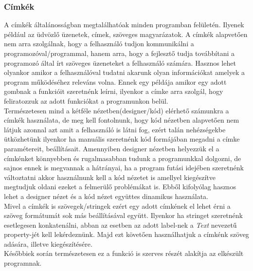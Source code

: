\documentclass[tocnopagenum]{thesis-ekf}
\theoremstyle{definition}
\theoremstyle{remark}
\begin{document}
	\subsubsection{Címkék}
	\label{Címkék}
	A címkék általánosságban megtalálhatóak minden programban felületén. Ilyenek például az üdvözlő üzenetek, címek, szöveges magyarázatok.
	A címkék alapvetően nem arra szolgálnak, hogy a felhasználó tudjon kommunikálni a programozóval/programmal, hanem arra, hogy a fejlesztő tudja továbbítani a programozó által írt szöveges üzeneteket a felhasználó számára. Hasznos lehet olyankor amikor a felhasználóval tudatni akarunk olyan információkat amelyek a  program működéséhez releváns volna. Ennek egy példája amikor egy adott gombnak a funkcióit szeretnénk leírni, ilyenkor a címke arra szolgál, hogy feliratozzuk az adott funkciókat a programunkon belül.
	\\
	  Természetesen mind a kétféle nézetben(designer/kód) elérhető számunkra a címkék használata, de meg kell fontolnunk, hogy kód nézetben alapvetően nem látjuk azonnal azt amit a felhasználó is látni fog, ezért talán nehézségekbe ütközhetünk ilyenkor ha manuális szeretnénk kód formájában megadni a címke paramétereit, beállításait. Amennyiben designer nézetben helyezzük el a címkénket könnyebben és rugalmasabban tudunk a programunkkal dolgozni, de sajnos ennek is megvannak a hátrányai, ha a program futási idejében szeretnénk változtatni akkor használnunk kell a kód nézetet is amellyel kiegészítve megtudjuk oldani ezeket a felmerülő problémákat is. Ebből kifolyólag hasznos lehet a designer nézet és a kód nézet együttes dinamikus használata.
	  \\
	  Mivel a címkék is szövegek/stringek ezért egy adott címkének el lehet érni a szöveg formátumát sok más beállításával együtt. Ilyenkor ha stringet szeretnénk esetlegesen konkatenálni, abban az esetben az adott label-nek a \textit{Text} nevezetű property-jét kell lekérdeznünk. Majd ezt követően használhatjuk a címkénk szöveg adására, illetve kiegészítésére.
	\\
	Későbbiek során természetesen ez a funkció is szerves részét alakítja az elkészült programnak.
\end{document}
